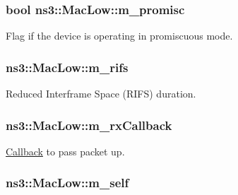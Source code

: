 \subsubsection[{\texorpdfstring{m\+\_\+promisc}{m_promisc}}]{\setlength{\rightskip}{0pt plus 5cm}bool ns3\+::\+Mac\+Low\+::m\+\_\+promisc\hspace{0.3cm}{\ttfamily [private]}}\hypertarget{classns3_1_1MacLow_ad13beb74b1519291ee00d14f1d532fdb}{}\label{classns3_1_1MacLow_ad13beb74b1519291ee00d14f1d532fdb}


Flag if the device is operating in promiscuous mode. 

\subsubsection[{\texorpdfstring{m\+\_\+rifs}{m_rifs}}]{ ns3\+::\+Mac\+Low\+::m\+\_\+rifs\hspace{0.3cm}{\ttfamily [private]}}\hypertarget{classns3_1_1MacLow_afb4a9a2b443271b3dab4091c3e7190c7}{}\label{classns3_1_1MacLow_afb4a9a2b443271b3dab4091c3e7190c7}


Reduced Interframe Space (R\+I\+FS) duration. 

\subsubsection[{\texorpdfstring{m\+\_\+rx\+Callback}{m_rxCallback}}]{ ns3\+::\+Mac\+Low\+::m\+\_\+rx\+Callback\hspace{0.3cm}{\ttfamily [private]}}\hypertarget{classns3_1_1MacLow_ac5f2b06b6151c99816c66b7bf946a4d8}{}\label{classns3_1_1MacLow_ac5f2b06b6151c99816c66b7bf946a4d8}


\hyperlink{classns3_1_1Callback}{Callback} to pass packet up. 

\subsubsection[{\texorpdfstring{m\+\_\+self}{m_self}}]{ ns3\+::\+Mac\+Low\+::m\+\_\+self\hspace{0.3cm}{\ttfamily [private]}}\hypertarget{classns3_1_1MacLow_a23004ca5405c82111f5b20eec03b3d9a}{}\label{classns3_1_1MacLow_a23004ca5405c82111f5b20eec03b3d9a}


